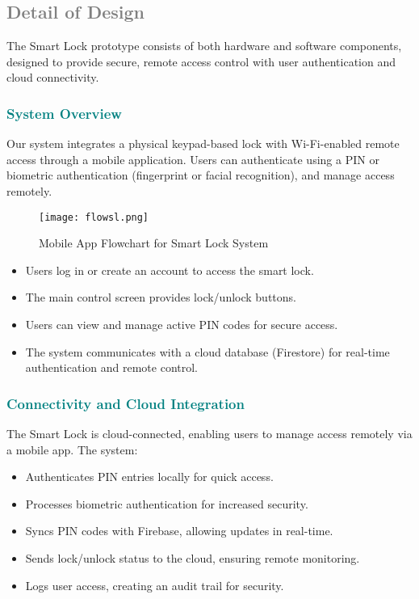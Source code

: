 \subsection{\textcolor{gray}{Detail of Design}}
The Smart Lock prototype consists of both hardware and software components, designed to provide secure, remote access control with user authentication and cloud connectivity.

\subsubsection{\textcolor{teal}{System Overview}}

Our system integrates a physical keypad-based lock with Wi-Fi-enabled remote access through a mobile application. Users can authenticate using a PIN or biometric authentication (fingerprint or facial recognition), and manage access remotely.

\begin{figure}[h]
    \centering
    \texttt{[image: flowsl.png]}
    \caption{Mobile App Flowchart for Smart Lock System}
\end{figure}

\begin{itemize}
    \item Users log in or create an account to access the smart lock.
    \item The main control screen provides lock/unlock buttons.
    \item Users can view and manage active PIN codes for secure access.
    \item The system communicates with a cloud database (Firestore) for real-time authentication and remote control.
\end{itemize}

\subsubsection{\textcolor{teal}{Connectivity and Cloud Integration}}

The Smart Lock is cloud-connected, enabling users to manage access remotely via a mobile app. The system:
\begin{itemize}
    \item Authenticates PIN entries locally for quick access.
    \item Processes biometric authentication for increased security.
    \item Syncs PIN codes with Firebase, allowing updates in real-time.
    \item Sends lock/unlock status to the cloud, ensuring remote monitoring.
    \item Logs user access, creating an audit trail for security.
\end{itemize}

